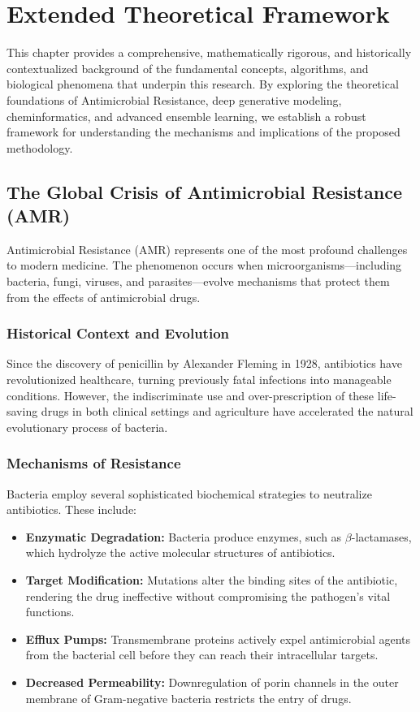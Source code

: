 
\chapter{Extended Theoretical Framework}

This chapter provides a comprehensive, mathematically rigorous, and historically contextualized background of the fundamental concepts, algorithms, and biological phenomena that underpin this research. By exploring the theoretical foundations of Antimicrobial Resistance, deep generative modeling, cheminformatics, and advanced ensemble learning, we establish a robust framework for understanding the mechanisms and implications of the proposed methodology.

\section{The Global Crisis of Antimicrobial Resistance (AMR)}

Antimicrobial Resistance (AMR) represents one of the most profound challenges to modern medicine. The phenomenon occurs when microorganisms—including bacteria, fungi, viruses, and parasites—evolve mechanisms that protect them from the effects of antimicrobial drugs. 

\subsection{Historical Context and Evolution}
Since the discovery of penicillin by Alexander Fleming in 1928, antibiotics have revolutionized healthcare, turning previously fatal infections into manageable conditions. However, the indiscriminate use and over-prescription of these life-saving drugs in both clinical settings and agriculture have accelerated the natural evolutionary process of bacteria. 

\subsection{Mechanisms of Resistance}
Bacteria employ several sophisticated biochemical strategies to neutralize antibiotics. These include:
\begin{itemize}
    \item \textbf{Enzymatic Degradation:} Bacteria produce enzymes, such as $\beta$-lactamases, which hydrolyze the active molecular structures of antibiotics.
    \item \textbf{Target Modification:} Mutations alter the binding sites of the antibiotic, rendering the drug ineffective without compromising the pathogen's vital functions.
    \item \textbf{Efflux Pumps:} Transmembrane proteins actively expel antimicrobial agents from the bacterial cell before they can reach their intracellular targets.
    \item \textbf{Decreased Permeability:} Downregulation of porin channels in the outer membrane of Gram-negative bacteria restricts the entry of drugs.
\end{itemize}

